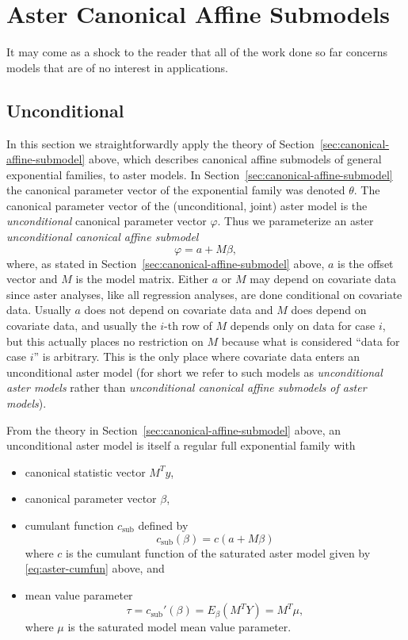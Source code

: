 \section{Aster Canonical Affine Submodels}
\label{sec:canonical-affine-submodels}

It may come as a shock to the reader that all of the work done so far
concerns models that are of no interest in applications.

\subsection{Unconditional}

In this section we straightforwardly apply the theory
of Section~\ref{sec:canonical-affine-submodel} above,
which describes canonical affine submodels of general exponential families,
to aster models.  In Section~\ref{sec:canonical-affine-submodel} the canonical
parameter vector of the exponential family was denoted $\theta$.
The canonical parameter vector of the (unconditional, joint) aster model
is the \emph{unconditional} canonical parameter vector $\varphi$.
Thus we parameterize an aster \emph{unconditional canonical affine submodel}
\begin{equation} \label{eq:affine-unconditional}
   \varphi = a + M \beta,
\end{equation}
where, as stated in Section~\ref{sec:canonical-affine-submodel} above,
$a$ is the offset vector and $M$ is the model matrix.
Either $a$ or $M$ may depend on covariate data since aster analyses,
like all regression analyses, are done conditional on covariate data.
Usually $a$ does not depend on covariate data and $M$ does depend
on covariate data, and usually the $i$-th row of $M$ depends only on
data for case $i$, but this actually places no restriction on $M$ because
what is considered ``data for case $i$'' is arbitrary.
This is the only place where covariate data enters
an unconditional aster model (for short we refer to such models
as \emph{unconditional aster models} rather than
\emph{unconditional canonical affine submodels of aster models}).

From the theory in Section~\ref{sec:canonical-affine-submodel} above,
an unconditional aster model is itself a regular full exponential family
with
\begin{itemize}
\item canonical statistic vector $M^T y$,
\item canonical parameter vector $\beta$,
\item cumulant function $c_\text{sub}$ defined by
$$
   c_\text{sub}(\beta) = c(a + M \beta)
$$
where $c$ is the cumulant function of the saturated aster model given by
\eqref{eq:aster-cumfun} above, and
\item mean value parameter
$$
   \tau = c_\text{sub}'(\beta) = E_\beta(M^T Y) = M^T \mu,
$$
where $\mu$ is the saturated model mean value parameter.
\end{itemize}


